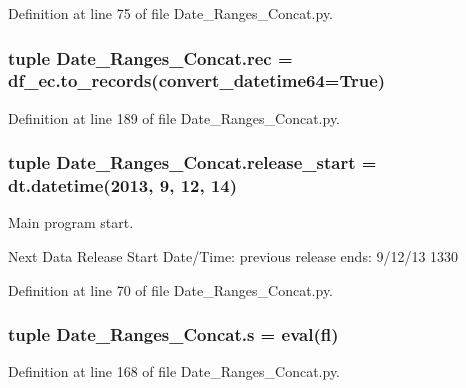 Definition at line 75 of file Date\+\_\+\+Ranges\+\_\+\+Concat.\+py.

\hypertarget{namespace_date___ranges___concat_ac0cc4e95ba47cc142babd87c506585a0}{}
\subsubsection[{rec}]{\setlength{\rightskip}{0pt plus 5cm}tuple Date\+\_\+\+Ranges\+\_\+\+Concat.\+rec = df\+\_\+ec.\+to\+\_\+records(convert\+\_\+datetime64=True)}\label{namespace_date___ranges___concat_ac0cc4e95ba47cc142babd87c506585a0}


Definition at line 189 of file Date\+\_\+\+Ranges\+\_\+\+Concat.\+py.

\hypertarget{namespace_date___ranges___concat_a547bfe8822d57255b64be4659758e9bc}{}
\subsubsection[{release\+\_\+start}]{\setlength{\rightskip}{0pt plus 5cm}tuple Date\+\_\+\+Ranges\+\_\+\+Concat.\+release\+\_\+start = dt.\+datetime(2013, 9, 12, 14)}\label{namespace_date___ranges___concat_a547bfe8822d57255b64be4659758e9bc}


Main program start. 

Next Data Release Start Date/\+Time\+: previous release ends\+: 9/12/13 1330 

Definition at line 70 of file Date\+\_\+\+Ranges\+\_\+\+Concat.\+py.

\hypertarget{namespace_date___ranges___concat_a318819433e09d063ee652df56c6cc495}{}
\subsubsection[{s}]{\setlength{\rightskip}{0pt plus 5cm}tuple Date\+\_\+\+Ranges\+\_\+\+Concat.\+s = eval(fl)}\label{namespace_date___ranges___concat_a318819433e09d063ee652df56c6cc495}


Definition at line 168 of file Date\+\_\+\+Ranges\+\_\+\+Concat.\+py.


